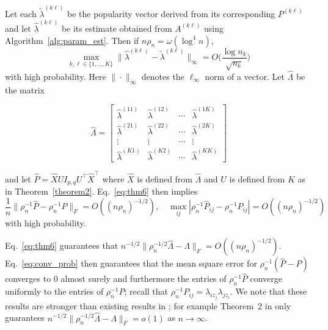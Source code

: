 \documentclass[12pt]{article}
\begin{document}
\begin{theorem}
\label{theorem6}
Let each $\tilde{\lambda}^{(k \ell)}$ be the popularity vector derived
from its corresponding $P^{(k \ell)}$ and let $\hat{\lambda}^{(k
  \ell)}$ be its estimate obtained from $A^{(k \ell)}$ using Algorithm~\ref{alg:param_est}.
Then if $n \rho_n = \omega( \log^{4}{n})$,
\begin{equation} \label{eq:thm6}
\max_{k, \ell \in \{1, ..., K\}} 
\|\hat{\lambda}^{(k \ell)} - \tilde{\lambda}^{(k \ell)}\|_{\infty} = 
O\bigg(\frac{\log n_k}{\sqrt{n_k}} \bigg)
\end{equation}
with high probability. Here $\|\cdot\|_{\infty}$ denotes the
$\ell_\infty$ norm of a vector. Let $\hat{\Lambda}$ be the matrix

$$\hat{\Lambda} = \begin{bmatrix} \hat{\lambda}^{(11)} &
  \hat{\lambda}^{(12)} & \cdots & \hat{\lambda}^{(1 K)} \\
  \hat{\lambda}^{(21)} &
  \hat{\lambda}^{(22)} & \cdots & \hat{\lambda}^{(2 K)} \\
  \vdots & \vdots & \cdots & \vdots \\
   \hat{\lambda}^{(K1)} &
  \hat{\lambda}^{(K2)} & \cdots & \hat{\lambda}^{(K K)} 
\end{bmatrix}$$

and let $\hat{P} = \hat{X} U I_{p,q} U^\top \hat{X}^{\top}$ 
where $\hat{X}$ is defined from $\hat{\Lambda}$ and $U$ is defined from $K$ as in Theorem~\ref{theorem2}. 
Eq.~\eqref{eq:thm6} then implies
\begin{equation}
\label{eq:conv_prob}
\frac{1}{n} \|\rho_n^{-1} \hat{P} - \rho_n^{-1} P\|_{F} = O((n
\rho_n)^{-1/2}), \quad \max_{ij} |\rho_n^{-1} \hat{P}_{ij} -
\rho_n^{-1} P_{ij}| = O((n \rho_n)^{-1/2})
\end{equation}
with high probability. \end{theorem}
Eq.~\eqref{eq:thm6} guarantees that $n^{-1/2} \|\rho_n^{-1/2} \hat{\Lambda} -
\Lambda\|_{F} = O((n \rho_n)^{-1/2})$. Eq.~\eqref{eq:conv_prob} then guarantees that
the mean square error for $\rho_n^{-1} (\hat{P} - P)$ converges to $0$ almost surely and
furthermore the entries of $\rho_n^{-1}
\hat{P}$ converge uniformly to the entries of $\rho_n^{-1} P$; recall that
$\rho_n^{-1} P_{ij} = \lambda_{iz_j} \lambda_{j z_i}$. We note that
these results are stronger than existing results in
\citet{307cbeb9b1be48299388437423d94bf1}; for example Theorem~2 in
\citet{307cbeb9b1be48299388437423d94bf1} only guarantees $n^{-1/2} \|\rho_n^{-1/2} \hat{\Lambda} -
\Lambda\|_{F} = o(1)$ as $n \rightarrow \infty$.
\end{document}
